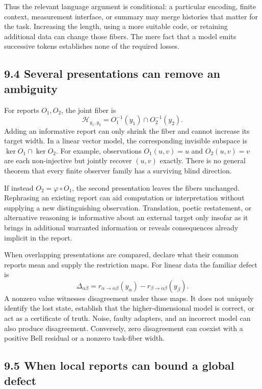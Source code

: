 \documentclass[
]{article}
\begin{document}
Thus the relevant language argument is conditional: a particular encoding, finite context, measurement interface, or summary may merge histories that matter for the task. Increasing the length, using a more suitable code, or retaining additional data can change those fibers. The mere fact that a model emits successive tokens establishes none of the required losses.

\subsection{9.4 Several presentations can remove an ambiguity}\label{several-presentations-can-remove-an-ambiguity}

For reports \(O_1,O_2\), the joint fiber is
\[
\mathcal H_{y_1,y_2}
=O_1^{-1}(y_1)\cap O_2^{-1}(y_2).
\]
Adding an informative report can only shrink the fiber and cannot increase its target width. In a linear vector model, the corresponding invisible subspace is \(\ker O_1\cap\ker O_2\). For example, observations \(O_1(u,v)=u\) and \(O_2(u,v)=v\) are each non-injective but jointly recover \((u,v)\) exactly. There is no general theorem that every finite observer family has a surviving blind direction.

If instead \(O_2=\varphi\circ O_1\), the second presentation leaves the fibers unchanged. Rephrasing an existing report can aid computation or interpretation without supplying a new distinguishing observation. Translation, poetic restatement, or alternative reasoning is informative about an external target only insofar as it brings in additional warranted information or reveals consequences already implicit in the report.

When overlapping presentations are compared, declare what their common reports mean and supply the restriction maps. For linear data the familiar defect is
\[
\Delta_{\alpha\beta}
=r_{\alpha\to\alpha\beta}(y_\alpha)
 -r_{\beta\to\alpha\beta}(y_\beta).
\]
A nonzero value witnesses disagreement under those maps. It does not uniquely identify the lost state, establish that the higher-dimensional model is correct, or act as a certificate of truth. Noise, faulty adapters, and an incorrect model can also produce disagreement. Conversely, zero disagreement can coexist with a positive Bell residual or a nonzero task-fiber width.

\subsection{9.5 When local reports can bound a global defect}\label{when-local-reports-can-bound-a-global-defect}
\end{document}
